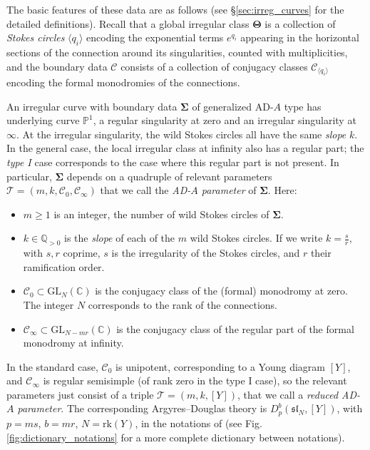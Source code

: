 \documentclass[11pt,a4paper]{amsart}
\numberwithin{equation}{section}
\newcommand{\cir}[1]{\langle #1 \rangle}
\begin{document}
The basic features of these data are as follows (see §\ref{sec:irreg_curves} for the detailed definitions).
Recall that a global irregular class $\bm\Theta$ is a collection of \emph{Stokes circles} $\cir{q_i}$ encoding the exponential terms $e^{q_i}$ appearing in the horizontal sections of the connection around its singularities, counted with multiplicities, and the boundary data $\bm{\mathcal C}$ consists of a collection of conjugacy classes $\mathcal C_{\cir{q_i}}$ encoding the formal monodromies of the connections.

An irregular curve with boundary data $\bm\Sigma$ of generalized AD-$A$ type has underlying curve $\mathbb P^1$, a regular singularity at zero and an irregular singularity at $\infty$. At the irregular singularity, the wild Stokes circles all have the same \emph{slope} $k$. In the general case, the local irregular class at infinity also has a regular part; the \emph{type I} case corresponds to the case where this regular part is not present. In particular, $\bm\Sigma$ depends on a quadruple of relevant parameters $\mathcal T=(m, k,\mathcal C_0, \mathcal C_\infty)$ that we call the \emph{AD-$A$ parameter} of $\bm\Sigma$. Here:
\begin{itemize}
\item $m\geq 1$ is an integer, the number of wild Stokes circles of $\bm\Sigma$.
\item $k\in \mathbb Q_{>0}$ is the \emph{slope} of each of the $m$ wild Stokes circles. If we write $k=\frac{s}{r}$, with $s, r$ coprime, $s$ is the irregularity of the Stokes circles, and $r$ their ramification order.
\item $\mathcal C_0\subset \mathrm{GL}_N(\mathbb C)$ is the conjugacy class of the (formal) monodromy at zero. The integer $N$ corresponds to the rank of the connections. 
\item $\mathcal C_\infty\subset \mathrm{GL}_{N-mr}(\mathbb C)$  is the conjugacy class of the regular part of the formal monodromy at infinity.
\end{itemize}
In the standard case, $\mathcal C_0$ is unipotent, corresponding to a Young diagram $[Y]$, and $\mathcal C_\infty$ is regular semisimple (of rank zero in the type I case), so the relevant parameters just consist of a triple $\mathscr T=(m, k,[Y])$, that we call a \emph{reduced AD-$A$ parameter}. The corresponding Argyres--Douglas theory is $D^b_p(\mathfrak{sl}_N, [Y])$, with $p=ms$, $b=mr$, $N=\mathrm{rk}(Y)$, in the notations of \cite{beem2025simplifying} (see Fig. \ref{fig:dictionary_notations} for a more complete dictionary between notations).
\end{document}

